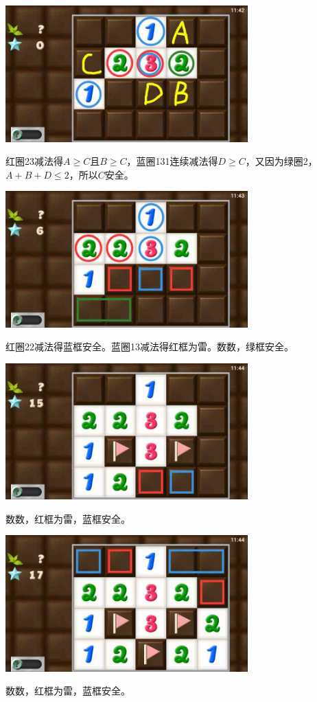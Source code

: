 \subsection{} %
\begin{center}
    \includegraphics[width=0.7\textwidth]{puzzlelow/168-1.jpg}
\end{center}
红圈23减法得$A\ge C$且$B\ge C$，蓝圈131连续减法得$D\ge C$，又因为绿圈2，$A+B+D\le 2$，所以$C$安全。
\begin{center}
    \includegraphics[width=0.7\textwidth]{puzzlelow/168-2.jpg}
\end{center}
红圈22减法得蓝框安全。蓝圈13减法得红框为雷。数数，绿框安全。
\begin{center}
    \includegraphics[width=0.7\textwidth]{puzzlelow/168-3.jpg}
\end{center}
数数，红框为雷，蓝框安全。
\begin{center}
    \includegraphics[width=0.7\textwidth]{puzzlelow/168-4.jpg}
\end{center}
数数，红框为雷，蓝框安全。

